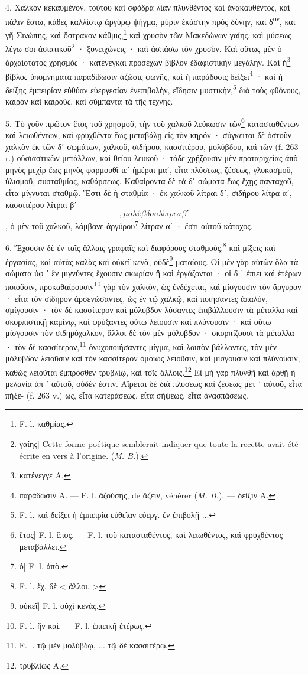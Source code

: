 \documentclass[a4paper, 11pt, oneside, polutonikogreek, french]{article}
\newcommand*\svgA{}
\begin{document}
4. Χαλκὸν κεκαυμένον, τούτου καὶ σφόδρα λίαν πλυνθέντος καὶ ἀνακαυθέντος, καὶ πάλιν ἔστω, κάθες καλλίστῳ ἀργύρῳ ψήγμα, μύριν ἑκάστην πρὸς δύνην, καὶ δ\textsuperscript{ον}, καὶ γῆ Σινώπης, καὶ ὄστρακον κάθμις,\footnote{F. l. καθμίας.} καὶ χρυσὸν τῶν Μακεδώνων γαίης, καὶ μύσεως λέγω σοι ἀσιατικοῦ\footnote{γαίης] Cette forme poétique semblerait indiquer que toute la recette avait été écrite en vers à l'origine. (\emph{M. B.}).} · ξυνειχώνεις · καὶ ἀσπάσω τὸν χρυσὸν. Καὶ οὕτως μὲν ὁ ἀρχαίοτατος χρησμός · κατένεγκαι προσέχων βίβλον ἐδαφιστικὴν μεγάλην. Καὶ ἡ\footnote{κατένεγγε A.} βίβλος ὑπομνήματα παραδίδωσιν ἀζώσις φωνῆς, καὶ ἡ παράδοσις δείξει\footnote{παράδωσιν A. --- F. l. ἁζούσης, de ἅζειν, vénérer (\emph{M. B.}). --- δείξιν A.} · καὶ ἡ δείξης ἐμπειρίαν εὐθύαν εὐεργεσίαν ἐνεπιβολὴν, εἴδησιν μυστικὴν,\footnote{F. l. καὶ δείξει ἡ ἐμπειρία εὐθεῖαν εὐεργ. ἐν ἐπιβολῇ ...} διὰ τοὺς φθόνους, καιρὸν καὶ καιροὺς, καὶ σύμπαντα τὰ τῆς τέχνης.

5. Τὸ γοῦν πρῶτον ἔτος τοῦ χρησμοῦ, τὴν τοῦ χαλκοῦ λεύκωσιν τῶν\footnote{ἔτος] F. l. ἔπος. --- F. l. τοῦ κατασταθέντος, καὶ λειωθέντος, καὶ φρυχθέντος μεταβάλλει.} κατασταθέντων καὶ λειωθέντων, καὶ φρυχθέντα ἕως μεταβάλῃ εἰς τὸν κηρόν · σύγκειται δὲ ὀστοῦν χαλκὸν ἐκ τῶν δʹ σωμάτων, χαλκοῦ, σιδήρου, κασσιτέρου, μολύβδου, καὶ τῶν (f. 263 r.) οὐσιαστικῶν μετάλλων, καὶ θείου λευκοῦ · τάδε χρῄζουσιν μὲν προταριχείας ἀπὸ μηνὸς μεχὶρ ἕως μηνὸς φαρμουθὶ ιεʹ ἡμέραι μαʹ, εἶτα πλύσεως, ζέσεως, γλυκασμοῦ, ὑλισμοῦ, συσταθμίας, καθάρσεως. Καθαίροντα δὲ τὰ δʹ σώματα ἕως ἔχῃς πανταχοῦ, εἶτα μίγνυται σταθμῷ. Ἔστι δὲ ἡ σταθμία · ἐκ χαλκοῦ λίτραι δʹ, σιδήρου λίτρα αʹ, κασσιτέρου λίτραι βʹ $\svgA$, μολύβδου λίτραι βʹ $\svgA$, ὁ μὲν τοῦ χαλκοῦ, λάμβανε ἀργύρου\footnote{ὁ] F. l. ἀπὸ.} λίτραν αʹ · ἔστι αὐτοῦ κάτοχος.

6. Ἔχουσιν δὲ ἐν ταῖς ἄλλαις γραφαῖς καὶ διαφόρους σταθμοὺς,\footnote{F. l. ἔχ. δὲ < ἅλλοι. >} καὶ μίξεις καὶ ἐργασίας, καὶ αὐτὰς καλὰς καὶ οὐκεῖ κενὰ, οὐδὲ\footnote{οὐκεῖ] F. l. οὐχὶ κενὰς.} ματαίους. Οἱ μὲν γὰρ αὐτῶν ὅλα τὰ σώματα ὑφ ᾽ ἓν μιγνύντες ἔχουσιν σκωρίαν ἢ καὶ ἐργάζονται · οἱ δ ᾽ ἐπιει καὶ ἑτέρων ποιοῦσιν, προκαθαίρουσιν\footnote{F. l. ἥν καὶ. --- F. l. ἐπιεικῆ ἑτέρως.} γὰρ τὸν χαλκὸν, ὡς ἐνδέχεται, καὶ μίσγουσιν τὸν ἄργυρον · εἶτα τὸν σίδηρον ἀρσενώσαντες, ὡς ἐν τῷ χαλκῷ, καὶ ποιήσαντες ἁπαλὸν, σμίγουσιν · τὸν δὲ κασσίτερον καὶ μόλυβδον λύσαντες ἐπιβάλλουσιν τὰ μέταλλα καὶ σκορπιστικῇ καμίνῳ, καὶ φρύξαντες οὕτω λείουσιν καὶ πλύνουσιν · καὶ οὕτω μίσγουσιν τὸν σιδηρόχαλκον, ἄλλοι δὲ τὸν μὲν μόλυβδον · σκορπίζουσι τὰ μέταλλα · τὸν δὲ κασσίτερον,\footnote{F. l. τῷ μὲν μολύβδῳ, ... τῷ δὲ κασσιτέρῳ.} ὀνυχοποιήσαντες μίγμα, καὶ λοιπὸν βάλλοντες, τὸν μὲν μόλυβδον λειοῦσιν καὶ τὸν κασσίτερον ὁμοίως λειοῦσιν, καὶ μίσγουσιν καὶ πλύνουσιν, καθὼς λειοῦται ἔμπροσθεν τρυβλίῳ, καὶ τοῖς ἄλλοις.\footnote{τρυβλίως A.} Εἰ μὴ γὰρ πλυνθῇ καὶ ἀρθῇ ἡ μελανία ἀπ ᾽ αὐτοῦ, οὐδέν ἐστιν. Αἴρεται δὲ διὰ πλύσεως καὶ ζέσεως μετ ᾽ αὐτοῦ, εἷτα πήξε- (f. 263 v.) ως, εἶτα κατεράσεως, εἶτα σήψεως, εἶτα ἀνασπάσεως.
\end{document}
